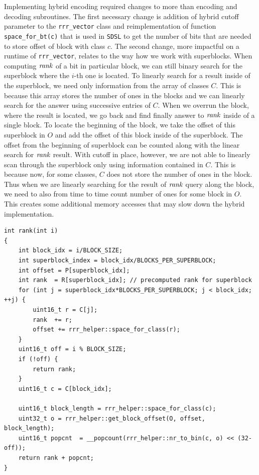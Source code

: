Implementing hybrid encoding required changes to more than encoding and decoding
subroutines. The first necessary change is addition of hybrid cutoff parameter
to the \texttt{rrr\_vector} class and reimplementation of function \texttt{space\_for\_bt(c)}
that is used in \texttt{SDSL} to get the number of bits that are needed to store offset
of block with class $c$. The second change, more impactful on a runtime
of \texttt{rrr\_vector}, relates to the way how we work with superblocks. When
computing $\mathit{rank}$ of a bit in particular block, we can still binary search for
the superblock where the $i$-th one is located. To linearly search for a result
inside of the superblock, we need only information from the array of classes $C$.
This is because this array stores the number of ones in the blocks and we can linearly
search for the answer using successive entries of $C$. When we overrun the block, where
the result is located, we go back and find finally answer to $\mathit{rank}$ inside of a
single block. To locate the beginning of the block, we take the offset of this superblock
in $O$ and add the offset of this block inside of the superblock. The offset from the
beginning of superblock can be counted along with the linear search for $\mathit{rank}$ result.
With cutoff in place, however, we are not able to linearly scan through the superblock
only using information contained in $C$. This is because now, for some classes, $C$ does
not store the number of ones in the block. Thus when we are linearly searching for the result
of $\mathit{rank}$ query along the block, we need to also from time to time count number of ones
for some block in $O$. This creates some additional memory accesses that may slow down the
hybrid implementation.

\begin{lstlisting}
int rank(int i)
{
	int block_idx = i/BLOCK_SIZE;
	int superblock_index = block_idx/BLOCKS_PER_SUPERBLOCK;
	int offset = P[superblock_idx];
	int rank  = R[superblock_idx]; // precomputed rank for superblock
	for (int j = superblock_idx*BLOCKS_PER_SUPERBLOCK; j < block_idx; ++j) {
		uint16_t r = C[j];
		rank  += r;
		offset += rrr_helper::space_for_class(r);
	}
	uint16_t off = i % BLOCK_SIZE;
	if (!off) {
		return rank;
	}
	uint16_t c = C[block_idx];

	uint16_t block_length = rrr_helper::space_for_class(c);
	uint32_t o = rrr_helper::get_block_offset(O, offset, block_length);
	uint16_t popcnt  = __popcount(rrr_helper::nr_to_bin(c, o) << (32-off));
	return rank + popcnt;
}
\end{lstlisting}

